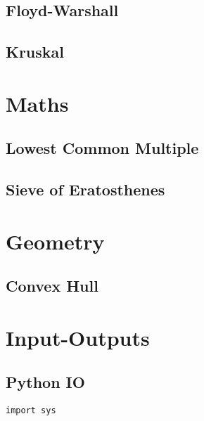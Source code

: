 \documentclass[10pt,a4paper]{article}
\begin{document}
\begin{landscape}
\begin{multicols}{2}
\subsection{Floyd-Warshall}



\subsection{Kruskal}



\section{Maths}

\subsection{Lowest Common Multiple}



\subsection{Sieve of Eratosthenes}



\section{Geometry}

\subsection{Convex Hull}



\section{Input-Outputs}

\subsection{Python IO}

\lstset{style=py}

\begin{lstlisting}
import sys


\end{lstlisting}
\end{multicols}
\end{landscape}
\end{document}
